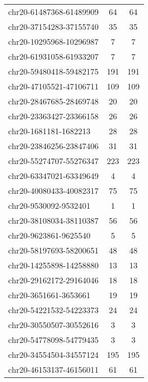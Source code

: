 \begin{longtable}{lSS}
	chr20-61487368-61489909 & 64     & 64                         \\
	chr20-37154283-37155740 & 35     & 35                         \\
	chr20-10295968-10296987 & 7      & 7                          \\
	chr20-61931058-61933207 & 7      & 7                          \\
	chr20-59480418-59482175 & 191    & 191                        \\
	chr20-47105521-47106711 & 109    & 109                        \\
	chr20-28467685-28469748 & 20     & 20                         \\
	chr20-23363427-23366158 & 26     & 26                         \\
	chr20-1681181-1682213   & 28     & 28                         \\
	chr20-23846256-23847406 & 31     & 31                         \\
	chr20-55274707-55276347 & 223    & 223                        \\
	chr20-63347021-63349649 & 4      & 4                          \\
	chr20-40080433-40082317 & 75     & 75                         \\
	chr20-9530092-9532401   & 1      & 1                          \\
	chr20-38108034-38110387 & 56     & 56                         \\
	chr20-9623861-9625540   & 5      & 5                          \\
	chr20-58197693-58200651 & 48     & 48                         \\
	chr20-14255898-14258880 & 13     & 13                         \\
	chr20-29162172-29164046 & 18     & 18                         \\
	chr20-3651661-3653661   & 19     & 19                         \\
	chr20-54221532-54223373 & 24     & 24                         \\
	chr20-30550507-30552616 & 3      & 3                          \\
	chr20-54778098-54779435 & 3      & 3                          \\
	chr20-34554504-34557124 & 195    & 195                        \\
	chr20-46153137-46156011 & 61     & 61                         \\

\end{longtable}
